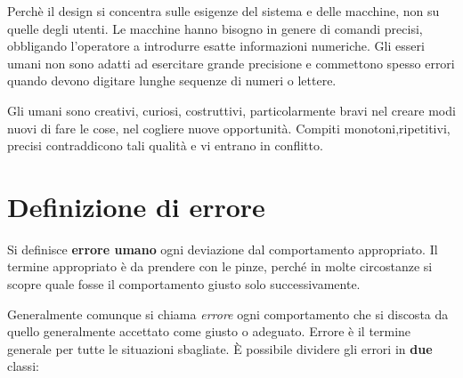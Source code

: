 \documentclass[a4paper,11pt,oneside]{book}
\begin{document}
Perchè il design si concentra sulle esigenze del sistema
e delle macchine, non su quelle degli utenti. Le macchine hanno bisogno in genere di
comandi precisi, obbligando l'operatore a introdurre esatte informazioni numeriche. Gli esseri umani non sono adatti ad esercitare grande precisione e commettono spesso
errori quando devono digitare lunghe sequenze di numeri o lettere.

Gli umani sono creativi, curiosi, costruttivi, particolarmente bravi nel creare modi nuovi di fare le cose, nel cogliere nuove opportunità. Compiti monotoni,ripetitivi, precisi contraddicono tali qualità e vi entrano in conflitto.

\section{Definizione di errore}
Si definisce \textbf{errore umano} ogni deviazione dal comportamento appropriato. Il termine appropriato è da prendere con le pinze, perché in molte circostanze si scopre quale fosse il comportamento giusto solo successivamente.

Generalmente comunque si chiama \textit{errore} ogni comportamento che si discosta da quello generalmente accettato come giusto o adeguato. Errore è il termine generale per tutte le situazioni sbagliate. È possibile dividere gli errori in \textbf{due} classi:
\end{document}
